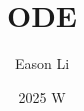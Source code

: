 \documentclass{article}
\begin{document}
\title{ODE }
\author{Eason Li}
\date{2025 W}
\maketitle
\end{document}
